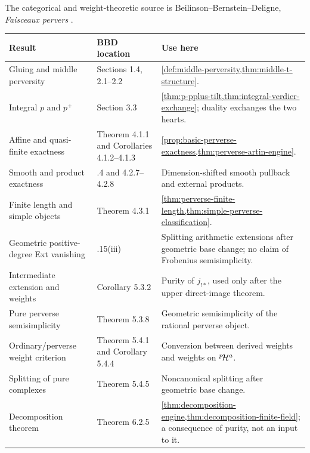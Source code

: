 The categorical and weight-theoretic source is
Beilinson--Bernstein--Deligne, \emph{Faisceaux pervers} \cite{BBD}.

\begin{longtable}{
 >{\raggedright\arraybackslash}p{}
 >{\raggedright\arraybackslash}p{}
 >{\raggedright\arraybackslash}p{}}
\toprule
Result & BBD location & Use here\\
\midrule
\endhead
Gluing and middle perversity &
Sections 1.4, 2.1--2.2 &
\cref{def:middle-perversity,thm:middle-t-structure}.\\

Integral \(p\) and \(p^+\) &
Section 3.3 &
\cref{thm:p-pplus-tilt,thm:integral-verdier-exchange};
duality exchanges the two hearts.\\

Affine and quasi-finite exactness &
Theorem 4.1.1 and Corollaries 4.1.2--4.1.3 &
\cref{prop:basic-perverse-exactness,thm:perverse-artin-engine}.\\

Smooth and product exactness &
4.2.4 and 4.2.7--4.2.8 &
Dimension-shifted smooth pullback and external products.\\

Finite length and simple objects &
Theorem 4.3.1 &
\cref{thm:perverse-finite-length,thm:simple-perverse-classification}.\\

Geometric positive-degree Ext vanishing &
5.1.15(iii) &
Splitting arithmetic extensions after geometric base change; no claim of
Frobenius semisimplicity.\\

Intermediate extension and weights &
Corollary 5.3.2 &
Purity of \(j_{!*}\), used only after the upper direct-image theorem.\\

Pure perverse semisimplicity &
Theorem 5.3.8 &
Geometric semisimplicity of the rational perverse object.\\

Ordinary/perverse weight criterion &
Theorem 5.4.1 and Corollary 5.4.4 &
Conversion between derived weights and weights on
\({}^{p}\!\mathcal H^a\).\\

Splitting of pure complexes &
Theorem 5.4.5 &
Noncanonical splitting after geometric base change.\\

Decomposition theorem &
Theorem 6.2.5 &
\cref{thm:decomposition-engine,thm:decomposition-finite-field};
a consequence of purity, not an input to it.\\
\bottomrule
\end{longtable}

